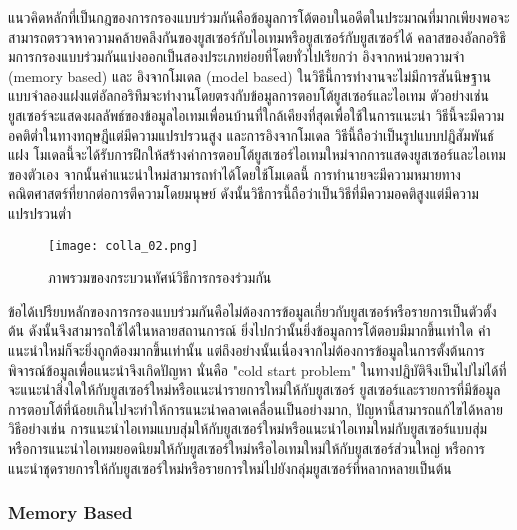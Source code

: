 แนวคิดหลักที่เป็นกฎของการกรองแบบร่วมกันคือข้อมูลการโต้ตอบในอดีตในประมาณที่มากเพียงพอจะสามารถตรวจหาความคล้ายคลึงกันของยูสเซอร์กับไอเทมหรือยูสเซอร์กับยูสเซอร์ได้ 
คลาสของอัลกอริธึมการกรองแบบร่วมกันแบ่งออกเป็นสองประเภทย่อยที่โดยทั่วไปเรียกว่า อิงจากหน่วยความจำ (memory based) และ อิงจากโมเดล (model based) ในวิธีนี้การทำงานจะไม่มีการสันนิษฐานแบบจำลองแฝงแต่อัลกอริทึมจะทำงานโดยตรงกับข้อมูลการตอบโต้ยูสเซอร์และไอเทม ตัวอย่างเช่น ยูสเซอร์จะแสดงผลลัพธ์ของข้อมูลไอเทมเพื่อนบ้านที่ใกล้เคียงที่สุดเพื่อใช้ในการแนะนำ วิธีนี้จะมีความอคติต่ำในทางทฤษฎีแต่มีความแปรปรวนสูง 
และการอิงจากโมเดล วิธีนี้ถือว่าเป็นรูปแบบปฎิสัมพันธ์แฝง โมเดลนี้จะได้รับการฝึกให้สร้างค่าการตอบโต้ยูสเซอร์ไอเทมใหม่จากการแสดงยูสเซอร์และไอเทมของตัวเอง จากนั้นคำแนะนำใหม่สามารถทำได้โดยใช้โมเดลนี้ การทำนายจะมีความหมายทางคณิตศาสตร์ที่ยากต่อการตีความโดยมนุษย์ ดังนั้นวิธีการนี้ถือว่าเป็นวิธีที่มีความอคติสูงแต่มีความแปรปรวนต่ำ
\newline
\begin{figure}[!h]
  \centering
  \texttt{[image: colla\_02.png]}  
  \caption{ภาพรวมของกระบวนทัศน์วิธีการกรองร่วมกัน}
  \label{Fig:colla_02}
\end{figure}
\pagebreak

ข้อได้เปรียบหลักของการกรองแบบร่วมกันคือไม่ต้องการข้อมูลเกี่ยวกับยูสเซอร์หรือรายการเป็นตัวตั้งต้น ดังนั้นจึงสามารถใช้ได้ในหลายสถานการณ์ ยิ่งไปกว่านั้นยิ่งข้อมูลการโต้ตอบมีมากขึ้นเท่าใด คำแนะนำใหม่ก็จะยิ่งถูกต้องมากขึ้นเท่านั้น
แต่ถึงอย่างนั้นเนื่องจากไม่ต้องการข้อมูลในการตั้งต้นการพิจารณ์ข้อมูลเพื่อแนะนำจึงเกิดปัญหา นั่นคือ "cold start problem" ในทางปฎิบัติจึงเป็นไปไม่ได้ที่จะแนะนำสิ่งใดให้กับยูสเซอร์ใหม่หรือแนะนำรายการใหม่ให้กับยูสเซอร์ ยูสเซอร์และรายการที่มีข้อมูลการตอบโต้ที่น้อยเกินไปจะทำให้การแนะนำคลาดเคลื่อนเป็นอย่างมาก, ปัญหานี้สามารถแก้ไขได้หลายวิธีอย่างเช่น การแนะนำไอเทมแบบสุ่มให้กับยูสเซอร์ใหม่หรือแนะนำไอเทมใหม่กับยูสเซอร์แบบสุ่ม หรือการแนะนำไอเทมยอดนิยมให้กับยูสเซอร์ใหม่หรือไอเทมใหม่ให้กับยูสเซอร์ส่วนใหญ่ หรือการแนะนำชุดรายการให้กับยูสเซอร์ใหม่หรือรายการใหม่ไปยังกลุ่มยูสเซอร์ที่หลากหลายเป็นต้น

\pagebreak
\subsubsection{Memory Based}
